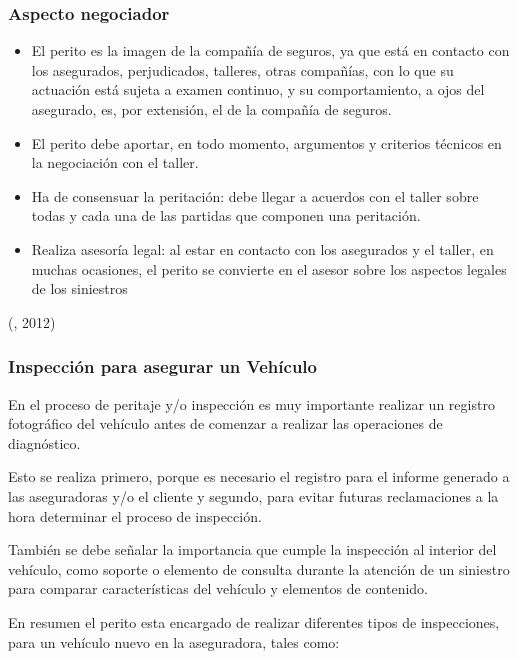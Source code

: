 \subsubsection{Aspecto negociador}
\begin{itemize}

\item El perito es la imagen de la compañía de seguros, ya que está en contacto con los asegurados, perjudicados, talleres, otras compañías, con lo que su actuación está sujeta a examen continuo, y su comportamiento, a ojos del asegurado, es, por extensión, el de la compañía de seguros. 

\item El perito debe aportar, en todo momento, argumentos y criterios técnicos en la negociación con el taller.

\item Ha de consensuar la peritación: debe llegar a acuerdos con el taller sobre todas y cada una de las partidas que componen una peritación.

\item Realiza asesoría legal: al estar en contacto con los asegurados y el taller, en muchas ocasiones, el perito se convierte en el asesor sobre los aspectos legales de los siniestros

\end{itemize}


(\citet{peritobib}, 2012)
\subsubsection{Inspección para asegurar un Vehículo}

En el proceso de peritaje y/o inspección es muy importante realizar un registro fotográfico del vehículo antes de comenzar a realizar las operaciones de diagnóstico.

Esto se realiza primero, porque es necesario el registro para el informe generado a las aseguradoras y/o el cliente y segundo, para evitar futuras reclamaciones a la hora determinar el proceso de inspección.

También se debe señalar la importancia que cumple la inspección al interior del vehículo, como soporte o elemento de consulta durante la atención de un siniestro para comparar características del vehículo y elementos de contenido.

En resumen el perito esta encargado de realizar diferentes tipos de inspecciones, para un vehículo nuevo en la aseguradora, tales como:

